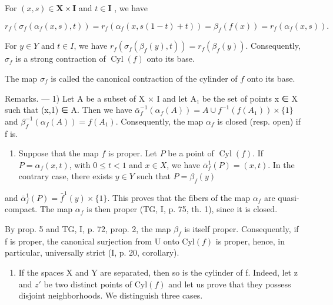 For \((x,s)\in \mathbf{X}\times \mathbf{I}\) and \(t\in \mathbf{I}\) , we have

\[
r _ {f} \left(\sigma_ {f} \left(\alpha_ {f} (x, s), t\right)\right) = r _ {f} \left(\alpha_ {f} (x, s (1 - t) + t)\right) = \beta_ {f} (f (x)) = r _ {f} \left(\alpha_ {f} (x, s)\right).
\]

For \(y \in Y\) and \(t \in I\), we have \(r_{f}(\sigma_{f}(\beta_{f}(y), t)) = r_{f}(\beta_{f}(y))\). Consequently, \(\sigma_{f}\) is a strong contraction of \(\operatorname{Cyl}(f)\) onto its base.

The map \(\sigma_{f}\) is called the canonical contraction of the cylinder of \(f\) onto its base.

Remarks. --- 1) Let A be a subset of X × I and let A₁ be the set of points x ∈ X such that (x,1) ∈ A. Then we have \(\bar{\alpha}_{f}^{-1}(\alpha_{f}(A)) = A \cup f^{-1}(f(A_{1})) \times \{1\}\) and \(\beta_{f}^{-1}(\alpha_{f}(A)) = f(A_{1})\). Consequently, the map \(\alpha_{f}\) is closed (resp. open) if f is.

\begin{enumerate}
\def\labelenumi{\arabic{enumi})}
\setcounter{enumi}{1}
\tightlist
\item
  Suppose that the map \(f\) is proper. Let \(P\) be a point of \(\operatorname{Cyl}(f)\). If \(P = \alpha_f(x,t)\), with \(0 \leqslant t < 1\) and \(x \in X\), we have \(\overline{\alpha}_f^1(P) = (x,t)\). In the contrary case, there exists \(y \in Y\) such that \(P = \beta_f(y)\)
\end{enumerate}

and \(\bar{\alpha}_{f}^{1}(P) = \bar{f}^{1}(y) \times \{1\}\). This proves that the fibers of the map \(\alpha_{f}\) are quasi-compact. The map \(\alpha_{f}\) is then proper (TG, I, p. 75, th. 1), since it is closed.

By prop. 5 and TG, I, p. 72, prop. 2, the map \(\beta_f\) is itself proper. Consequently, if f is proper, the canonical surjection from U onto \(\mathrm{Cyl}(f)\) is proper, hence, in particular, universally strict (I, p. 20, corollary).

\begin{enumerate}
\def\labelenumi{\arabic{enumi})}
\setcounter{enumi}{2}
\tightlist
\item
  If the spaces X and Y are separated, then so is the cylinder of f. Indeed, let z and \(z'\) be two distinct points of \(\mathrm{Cyl}(f)\) and let us prove that they possess disjoint neighborhoods. We distinguish three cases.
\end{enumerate}

